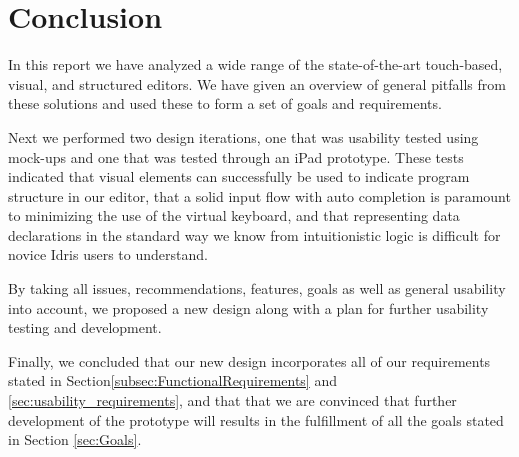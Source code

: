 \chapter{Conclusion}
\label{sec:Conclusion}

In this report we have analyzed a wide range of the state-of-the-art touch-based, visual, and structured
editors. We have given an overview of general pitfalls from these solutions and used these to form a set of goals and requirements. 

Next we performed two design iterations, one that was usability tested using
mock-ups and one that was tested through an iPad prototype. These tests
indicated that visual elements can successfully be used to indicate program structure in our editor, that
a solid input flow with auto completion is paramount to minimizing the use of
the virtual keyboard, and that representing data declarations in the standard
way we know from intuitionistic logic is difficult for novice Idris users to
understand.

By taking all issues, recommendations, features, goals as well as general usability into account, we proposed a new design along with a plan for further usability testing and development.

Finally, we concluded that our new design incorporates all of our requirements stated in
Section\ref{subsec:FunctionalRequirements} and
\ref{sec:usability_requirements}, and that that we are convinced that further development
of the prototype will results in the fulfillment of all the goals stated in
Section \ref{sec:Goals}.